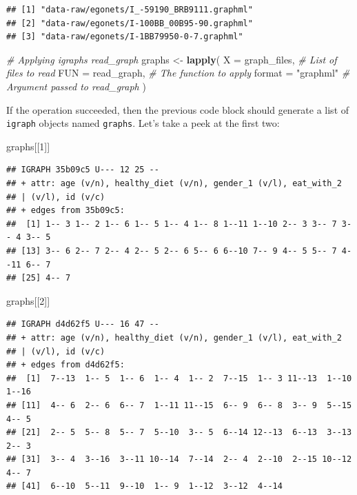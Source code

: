\documentclass[
]{book}
\newenvironment{Shaded}{\begin{snugshade}}{\end{snugshade}}
\newcommand{\AttributeTok}[1]{\textcolor[rgb]{0.13,0.29,0.53}{#1}}
\newcommand{\CommentTok}[1]{\textcolor[rgb]{0.56,0.35,0.01}{\textit{#1}}}
\newcommand{\DecValTok}[1]{\textcolor[rgb]{0.00,0.00,0.81}{#1}}
\newcommand{\FunctionTok}[1]{\textcolor[rgb]{0.13,0.29,0.53}{\textbf{#1}}}
\newcommand{\NormalTok}[1]{#1}
\newcommand{\OtherTok}[1]{\textcolor[rgb]{0.56,0.35,0.01}{#1}}
\newcommand{\StringTok}[1]{\textcolor[rgb]{0.31,0.60,0.02}{#1}}
\begin{document}
\begin{verbatim}
## [1] "data-raw/egonets/I_-59190_BRB9111.graphml"
## [2] "data-raw/egonets/I-100BB_00B95-90.graphml"
## [3] "data-raw/egonets/I-1BB79950-0-7.graphml"
\end{verbatim}

\begin{Shaded}
\begin{Highlighting}[]
\CommentTok{\# Applying igraph\textquotesingle{}s read\_graph}
\NormalTok{graphs }\OtherTok{\textless{}{-}} \FunctionTok{lapply}\NormalTok{(}
  \AttributeTok{X      =}\NormalTok{ graph\_files,       }\CommentTok{\# List of files to read}
  \AttributeTok{FUN    =}\NormalTok{ read\_graph,        }\CommentTok{\# The function to apply}
  \AttributeTok{format =} \StringTok{"graphml"}          \CommentTok{\# Argument passed to read\_graph}
\NormalTok{  )}
\end{Highlighting}
\end{Shaded}

If the operation succeeded, then the previous code block should generate a list of \texttt{igraph} objects named \texttt{graphs}. Let's take a peek at the first two:

\begin{Shaded}
\begin{Highlighting}[]
\NormalTok{graphs[[}\DecValTok{1}\NormalTok{]]}
\end{Highlighting}
\end{Shaded}

\begin{verbatim}
## IGRAPH 35b09c5 U--- 12 25 -- 
## + attr: age (v/n), healthy_diet (v/n), gender_1 (v/l), eat_with_2
## | (v/l), id (v/c)
## + edges from 35b09c5:
##  [1] 1-- 3 1-- 2 1-- 6 1-- 5 1-- 4 1-- 8 1--11 1--10 2-- 3 3-- 7 3-- 4 3-- 5
## [13] 3-- 6 2-- 7 2-- 4 2-- 5 2-- 6 5-- 6 6--10 7-- 9 4-- 5 5-- 7 4--11 6-- 7
## [25] 4-- 7
\end{verbatim}

\begin{Shaded}
\begin{Highlighting}[]
\NormalTok{graphs[[}\DecValTok{2}\NormalTok{]]}
\end{Highlighting}
\end{Shaded}

\begin{verbatim}
## IGRAPH d4d62f5 U--- 16 47 -- 
## + attr: age (v/n), healthy_diet (v/n), gender_1 (v/l), eat_with_2
## | (v/l), id (v/c)
## + edges from d4d62f5:
##  [1]  7--13  1-- 5  1-- 6  1-- 4  1-- 2  7--15  1-- 3 11--13  1--10  1--16
## [11]  4-- 6  2-- 6  6-- 7  1--11 11--15  6-- 9  6-- 8  3-- 9  5--15  4-- 5
## [21]  2-- 5  5-- 8  5-- 7  5--10  3-- 5  6--14 12--13  6--13  3--13  2-- 3
## [31]  3-- 4  3--16  3--11 10--14  7--14  2-- 4  2--10  2--15 10--12  4-- 7
## [41]  6--10  5--11  9--10  1-- 9  1--12  3--12  4--14
\end{verbatim}
\end{document}
